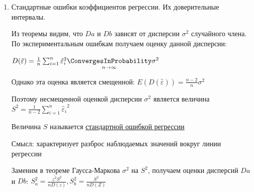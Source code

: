 \begin{enumerate}
\begin{MyTheorem}
        Если выполнено условия:

        \begin{enumerate}[label=\asbuk*),ref=\asbuk*]
            \item Случайные члены $\varepsilon_i$ независимые случайные величины, имеющие одинаковое нормальное распределение $\varepsilon_i \in N(0, \sigma^2)$
            \item Случайные величины $\varepsilon_i$ и $Z_i$ -- независимы
        \end{enumerate}

        Тогда $a$ и $b$ -- состоятельные, несмещенные, эффективные оценки параметров $\alpha$ и $\beta$, то есть

        \begin{enumerate}
            \item Состоятельность: $a \underset{n \to \infty}{\ConvergesInProbability} \alpha, b \underset{n \to \infty}{\ConvergesInProbability} \beta$
            \item Несмещенность: $Ea = \alpha, Eb = \beta$
            \item Наименьшая дисперсия, равная:

            $D a = \frac{\overline{z^2} \sigma^2}{n D(Z)}, Db = \frac{\sigma^2}{n D(Z)}$
        \end{enumerate}
    \end{MyTheorem}


    \item Стандартные ошибки коэффициентов регрессии. Их доверительные интервалы.

    Из теоремы видим, что $Da$ и $Db$ зависят от дисперсии $\sigma^2$ случайного члена. 
    По экспериментальным ошибкам получаем оценку данной дисперсии:

    $D(\hat \varepsilon) = \frac{1}{n} \sum_{i = 1}^n {\hat \varepsilon_i}^2 \underset{n \to \infty}{\ConvergesInProbability} \sigma^2$

    Однако эта оценка является смещенной: $E(D(\hat \varepsilon)) = \frac{n - 2}{n} \sigma^2$

    Поэтому несмещенной оценкой дисперсии $\sigma^2$ является величина $S^2 = \frac{1}{n - 2} \sum_{i = 1}^n {\hat \varepsilon_i}^2$

    \Def Величина $S$ называется \hyperlink{regression_coefficient_error}{стандартной ошибкой регрессии}

    Смысл: характеризует разброс наблюдаемых значений вокруг линии регрессии

    \Notas Заменим в теореме Гаусса-Маркова $\sigma^2$ на $S^2$, получаем оценки дисперсий $Da$ и $Db$: $S_a^2 = \frac{\overline{z^2} S^2}{n D(z)}, S^2_b = \frac{S^2}{n D(Z)}$


\end{enumerate}
